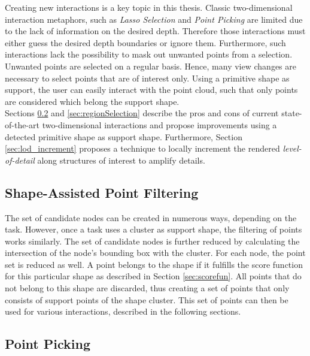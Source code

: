Creating new interactions is a key topic in this thesis. Classic two-dimensional interaction metaphors, such as \textit{Lasso Selection} and \textit{Point Picking} are limited due to the lack of information on the desired depth. Therefore those interactions must either guess the desired depth boundaries or ignore them. Furthermore, such interactions lack the possibility to mask out unwanted points from a selection. Unwanted points are selected on a regular basis. Hence, many view changes are necessary to select points that are of interest only. Using a primitive shape as support, the user can easily interact with the point cloud, such that only points are considered which belong the support shape. 
\\
Sections \ref{sec:pointPicking} and \ref{sec:regionSelection} describe the pros and cons of current state-of-the-art two-dimensional interactions and propose improvements using a detected primitive shape as support shape. Furthermore, Section \ref{sec:lod_increment} proposes a technique to locally increment the rendered \textit{level-of-detail} along structures of interest to amplify details. 


\subsection{Shape-Assisted Point Filtering}
\label{sec:pointFiltering}

The set of candidate nodes can be created in numerous ways, depending on the task. However, once a task uses a cluster as support shape, the filtering of points works similarly. The set of candidate nodes is further reduced by calculating the intersection of the node's bounding box with the cluster. For each node, the point set is reduced as well. A point belongs to the shape if it fulfills the score function for this particular shape as described in Section \ref{sec:scorefun}. All points that do not belong to this shape are discarded, thus creating a set of points that only consists of support points of the shape cluster. This set of points can then be used for various interactions, described in the following sections. 


\subsection{Point Picking}
\label{sec:pointPicking}

